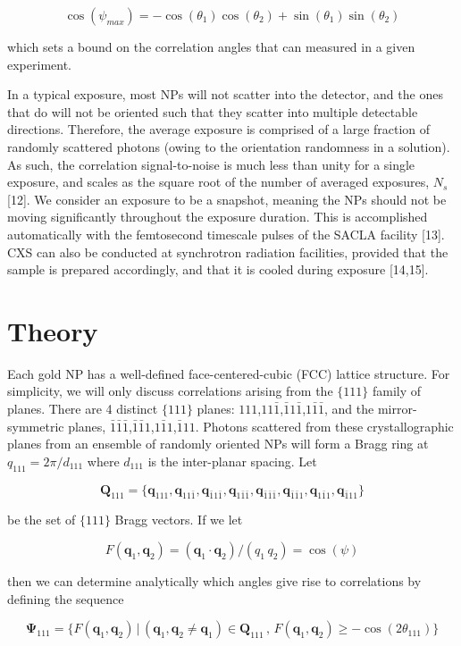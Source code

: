 \documentclass [11pt,fleqn]{article}
\def \be {\begin{equation}}
\def \ee {\end{equation}}
\begin{document}
\be \label{psimax}
\cos(\psi_{max}) = - \cos( \theta_1)\cos(\theta_2) + \sin(\theta_1)\sin(\theta_2)
\ee


which sets a bound on the correlation angles that can measured in a given experiment. 

In a typical exposure, most NPs will not scatter into the detector, and the ones that do will not be oriented such that they scatter into multiple detectable directions. Therefore, the average exposure is comprised of a large fraction of randomly scattered photons (owing to the orientation randomness in  a solution). As such, the correlation signal-to-noise is much less than unity for a single exposure, and scales as the square root of the number of averaged exposures, $N_s$ [12]. We consider an exposure to be a snapshot, meaning the NPs should not be moving significantly throughout the exposure duration. This is accomplished automatically with the femtosecond timescale pulses of the SACLA facility [13].  CXS can also be conducted at synchrotron radiation facilities, provided  that the sample is prepared accordingly, and that it is cooled during exposure [14,15]. 

\section{Theory}
Each gold NP has a well-defined face-centered-cubic (FCC) lattice structure. For simplicity, we will only discuss correlations arising from the $\{111\}$ family of planes. There are 4 distinct $\{111\}$ planes: $111$,$11\bar 1$,$\bar 1 1\bar 1$,$1\bar 1 \bar 1$, and the mirror-symmetric planes, $\bar 1\bar 1\bar 1$,$\bar 1\bar 1 1$,$1 \bar 11$,$\bar 1 1 1$.  Photons scattered from these crystallographic planes from an ensemble of randomly oriented NPs will form a Bragg ring at  $q_{111} = 2\pi / d_{111} $ where $d_{111}$ is the inter-planar spacing. Let 

\be
\bm Q_{111} = \{\bm q_{111}, \bm q_{11\bar 1},\bm q_{\bar 1 1\bar 1},\bm q_{1\bar 1 \bar 1},\bm q_{\bar 1\bar 1\bar 1},\bm q_{\bar 1\bar 1 1},\bm q_{1 \bar 11},\bm q_{\bar 1 1 1}\}
\ee

be the set of $\{111\}$ Bragg vectors. If we let 

\be
F( \bm q_1, \bm q_2) =  (\bm q_1 \cdot \bm q_2)/(q_1 \, q_2 ) = \cos( \psi )
\ee

then we can determine analytically which angles give rise to correlations by defining the sequence

\be \label{psiset}
\bm \Psi_{111} = \{ F( \bm q_1, \bm q_2)\, \big | \, (\bm q_1, \bm q_2 \ne \bm q_1) \in \bm Q_{111}\, ,\,  F( \bm q_1, \bm q_2) \ge -\cos ( 2\theta_{111}  )  \}
\ee 
\end{document}
